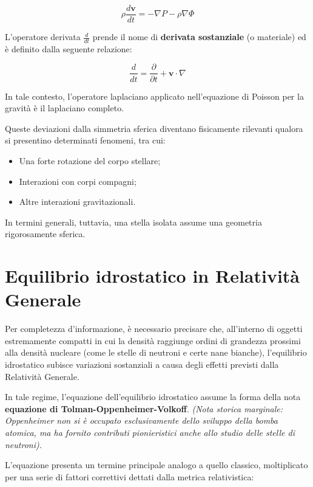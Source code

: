 \begin{equation}
\rho \frac{d\mathbf{v}}{dt} = -\nabla P - \rho \nabla \Phi
\end{equation}

L'operatore derivata $\frac{d}{dt}$ prende il nome di \textbf{derivata sostanziale} (o materiale) ed è definito dalla seguente relazione:

\begin{equation}
\frac{d}{dt} = \frac{\partial}{\partial t} + \mathbf{v} \cdot \nabla
\end{equation}

In tale contesto, l'operatore laplaciano applicato nell'equazione di Poisson per la gravità è il laplaciano completo.

Queste deviazioni dalla simmetria sferica diventano fisicamente rilevanti qualora si presentino determinati fenomeni, tra cui:
\begin{itemize}
\item Una forte rotazione del corpo stellare;
\item Interazioni con corpi compagni;
\item Altre interazioni gravitazionali.
\end{itemize}
In termini generali, tuttavia, una stella isolata assume una geometria rigorosamente sferica.

\section{Equilibrio idrostatico in Relatività Generale}

Per completezza d'informazione, è necessario precisare che, all'interno di oggetti estremamente compatti in cui la densità raggiunge ordini di grandezza prossimi alla densità nucleare (come le stelle di neutroni e certe nane bianche), l'equilibrio idrostatico subisce variazioni sostanziali a causa degli effetti previsti dalla Relatività Generale.

In tale regime, l'equazione dell'equilibrio idrostatico assume la forma della nota \textbf{equazione di Tolman-Oppenheimer-Volkoff}.
\textit{(Nota storica marginale: Oppenheimer non si è occupato esclusivamente dello sviluppo della bomba atomica, ma ha fornito contributi pionieristici anche allo studio delle stelle di neutroni).}

L'equazione presenta un termine principale analogo a quello classico, moltiplicato per una serie di fattori correttivi dettati dalla metrica relativistica:

